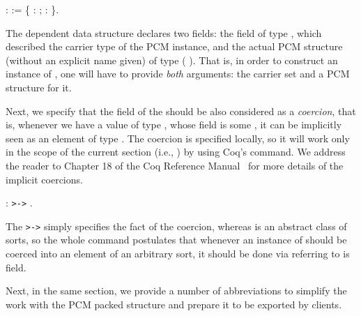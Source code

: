 \label{ref:pack_type}
\begin{coqdoccode}
\coqdocemptyline
\coqdocnoindent
{}  :  :=  \{ : ; \coqdocvar{\_} :  \}.\coqdoceol
\coqdocemptyline
\end{coqdoccode}


The dependent data structure  declares two fields: the
field  of type , which described the carrier type of the
PCM instance, and the actual PCM structure (without an explicit name
given) of type ( ). That is, in order to construct an
instance of , one will have to provide \textit{both} arguments:
the carrier set and a PCM structure for it.


Next, we specify that the field  of the  should be
also considered as a \textit{coercion}, that is, whenever we have a value of
type , whose field  is some , it can be implicitly
seen as an element of type . The coercion is specified locally, so
it will work only in the scope of the current section (i.e.,
) by using Coq's   command. We address the
reader to Chapter 18 of the Coq Reference Manual~\cite{Coq-manual}
for more details of the implicit coercions.


\begin{coqdoccode}
\coqdocemptyline
\coqdocnoindent
{}   :  \texttt{>->} .\coqdoceol
\coqdocemptyline
\end{coqdoccode}




The \texttt{>->} simply specifies the fact of the coercion, whereas
 is an abstract class of sorts, so the whole command
postulates that whenever an instance of  should be coerced
into an element of an arbitrary sort, it should be done via referring
to is  field.


Next, in the same section, we provide a number of abbreviations to
simplify the work with the PCM packed structure and prepare it to be
exported by clients.


